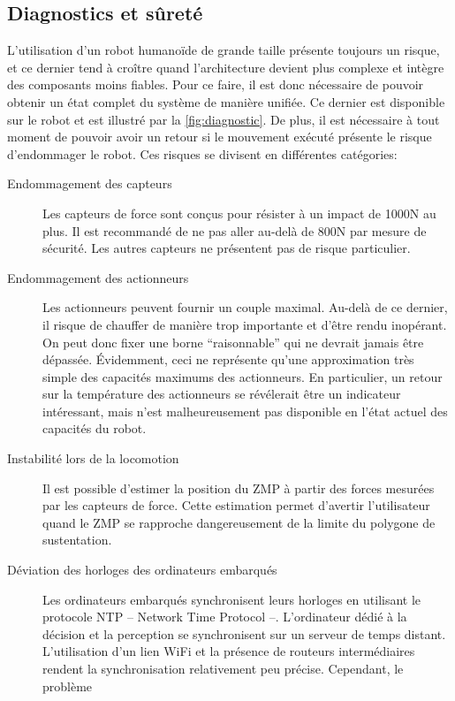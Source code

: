 \subsection{Diagnostics et sûreté}

L'utilisation d'un robot humanoïde de grande taille présente toujours
un risque, et ce dernier tend à croître quand l'architecture devient
plus complexe et intègre des composants moins fiables. Pour ce faire,
il est donc nécessaire de pouvoir obtenir un état complet du système
de manière unifiée. Ce dernier est disponible sur le robot et est
illustré par la \autoref{fig:diagnostic}. De plus, il est nécessaire à
tout moment de pouvoir avoir un retour si le mouvement exécuté
présente le risque d'endommager le robot. Ces risques se divisent en
différentes catégories:
\begin{description}
\item[Endommagement des capteurs] Les capteurs de force sont conçus
  pour résister à un impact de 1000N au plus. Il est recommandé de ne
  pas aller au-delà de 800N par mesure de sécurité. Les autres
  capteurs ne présentent pas de risque particulier.
\item[Endommagement des actionneurs] Les actionneurs peuvent fournir
  un couple maximal. Au-delà de ce dernier, il risque de chauffer de
  manière trop importante et d'être rendu inopérant. On peut donc
  fixer une borne ``raisonnable'' qui ne devrait jamais être
  dépassée. Évidemment, ceci ne représente qu'une approximation très
  simple des capacités maximums des actionneurs. En particulier, un
  retour sur la température des actionneurs se révélerait être un
  indicateur intéressant, mais n'est malheureusement pas disponible en
  l'état actuel des capacités du robot.
\item[Instabilité lors de la locomotion] Il est possible d'estimer la
  position du ZMP à partir des forces
  mesurées par les capteurs de force. Cette estimation permet
  d'avertir l'utilisateur quand le ZMP se rapproche dangereusement de
  la limite du polygone de sustentation.
\item[Déviation des horloges des ordinateurs embarqués] Les
  ordinateurs embarqués synchronisent leurs horloges en utilisant le
  protocole NTP -- Network Time Protocol --. L'ordinateur dédié à la décision et la perception
  se synchronisent sur un serveur de temps distant. L'utilisation d'un
  lien WiFi et la présence de routeurs intermédiaires rendent la
  synchronisation relativement peu précise. Cependant, le problème

\end{description}
